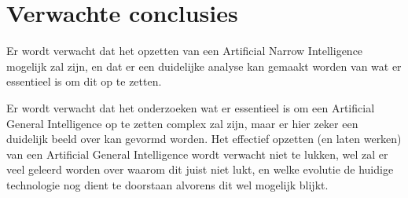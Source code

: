 \section{Verwachte conclusies}
\label{sec:verwachte_conclusies}
Er wordt verwacht dat het opzetten van een Artificial Narrow Intelligence mogelijk zal zijn, en dat er een duidelijke analyse kan gemaakt worden van wat er essentieel is om dit op te zetten. 

Er wordt verwacht dat het onderzoeken wat er essentieel is om een Artificial General Intelligence op te zetten complex zal zijn, maar er hier zeker een duidelijk beeld over kan gevormd worden. Het effectief opzetten (en laten werken) van een Artificial General Intelligence wordt verwacht niet te lukken, wel zal er veel geleerd worden over waarom dit juist niet lukt, en welke evolutie de huidige technologie nog dient te doorstaan alvorens dit wel mogelijk blijkt.

